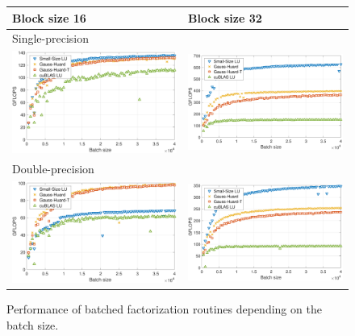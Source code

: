 \begin{figure}
\begin{center}
\begin{tabular}{ll}
Block size 16 & Block size 32\\
\hline
Single-precision\\
\includegraphics[width=.45\columnwidth]{plots/sgebjp_setup__lu_gje_gh_16.pdf}
&
\includegraphics[width=.45\columnwidth]{plots/sgebjp_setup__lu_gje_gh_32.pdf}\\
\hline
Double-precision\\
\includegraphics[width=.45\columnwidth]{plots/dgebjp_setup__lu_gje_gh_16.pdf}
&
\includegraphics[width=.45\columnwidth]{plots/dgebjp_setup__lu_gje_gh_32.pdf}
\end{tabular}
\end{center}
\caption{%
Performance of batched factorization routines depending on the batch size.}
\label{2017-lu-block-jacobi:fig:performance}
\end{figure}


